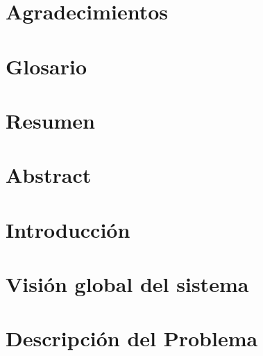 \documentclass[11pt,twoside]{docs/thesis}
\begin{document}
\maketitle
\makecoverletter

\chapter*{Agradecimientos} 
\chapter*{Glosario} 
\chapter*{Resumen}  
\chapter*{Abstract} 

  
  
\tableofcontents  %
\listoffigures 	  %
\listoftables     %
\mainmatter       %


\dominitoc
\cleardoublepage

\chapter{Introducci\'on}



\chapter{Visión global del sistema}



\chapter{Descripci\'on del Problema}
\end{document}
